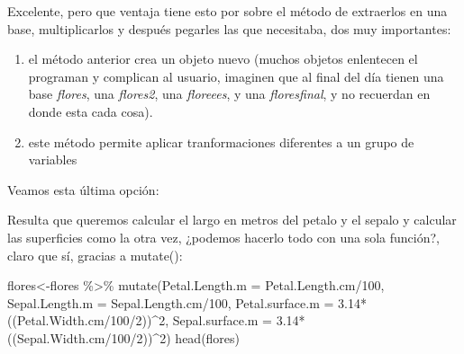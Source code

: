 \documentclass[
]{book}
\newenvironment{Shaded}{\begin{snugshade}}{\end{snugshade}}
\newcommand{\AttributeTok}[1]{\textcolor[rgb]{0.77,0.63,0.00}{#1}}
\newcommand{\DecValTok}[1]{\textcolor[rgb]{0.00,0.00,0.81}{#1}}
\newcommand{\FloatTok}[1]{\textcolor[rgb]{0.00,0.00,0.81}{#1}}
\newcommand{\FunctionTok}[1]{\textcolor[rgb]{0.00,0.00,0.00}{#1}}
\newcommand{\NormalTok}[1]{#1}
\newcommand{\OtherTok}[1]{\textcolor[rgb]{0.56,0.35,0.01}{#1}}
\newcommand{\SpecialCharTok}[1]{\textcolor[rgb]{0.00,0.00,0.00}{#1}}
\begin{document}
Excelente, pero que ventaja tiene esto por sobre el método de extraerlos en una base, multiplicarlos y después pegarles las que necesitaba, dos muy importantes:

\begin{enumerate}
\def\labelenumi{\arabic{enumi}.}
\item
  el método anterior crea un objeto nuevo (muchos objetos enlentecen el programan y complican al usuario, imaginen que al final del día tienen una base \emph{flores}, una \emph{flores2}, una \emph{floreees}, y una \emph{floresfinal}, y no recuerdan en donde esta cada cosa).
\item
  este método permite aplicar tranformaciones diferentes a un grupo de variables
\end{enumerate}

Veamos esta última opción:

Resulta que queremos calcular el largo en metros del petalo y el sepalo y calcular las superficies como la otra vez, ¿podemos hacerlo todo con una sola función?, claro que sí, gracias a mutate():

\begin{Shaded}
\begin{Highlighting}[]
\NormalTok{flores}\OtherTok{\textless{}{-}}\NormalTok{flores }\SpecialCharTok{\%\textgreater{}\%} \FunctionTok{mutate}\NormalTok{(}\AttributeTok{Petal.Length.m =}\NormalTok{ Petal.Length.cm}\SpecialCharTok{/}\DecValTok{100}\NormalTok{,}
                          \AttributeTok{Sepal.Length.m =}\NormalTok{ Sepal.Length.cm}\SpecialCharTok{/}\DecValTok{100}\NormalTok{,}
                          \AttributeTok{Petal.surface.m =} \FloatTok{3.14}\SpecialCharTok{*}\NormalTok{((Petal.Width.cm}\SpecialCharTok{/}\DecValTok{100}\SpecialCharTok{/}\DecValTok{2}\NormalTok{))}\SpecialCharTok{\^{}}\DecValTok{2}\NormalTok{,}
                          \AttributeTok{Sepal.surface.m =} \FloatTok{3.14}\SpecialCharTok{*}\NormalTok{((Sepal.Width.cm}\SpecialCharTok{/}\DecValTok{100}\SpecialCharTok{/}\DecValTok{2}\NormalTok{))}\SpecialCharTok{\^{}}\DecValTok{2}\NormalTok{)}
\FunctionTok{head}\NormalTok{(flores)                          }
\end{Highlighting}
\end{Shaded}
\end{document}
